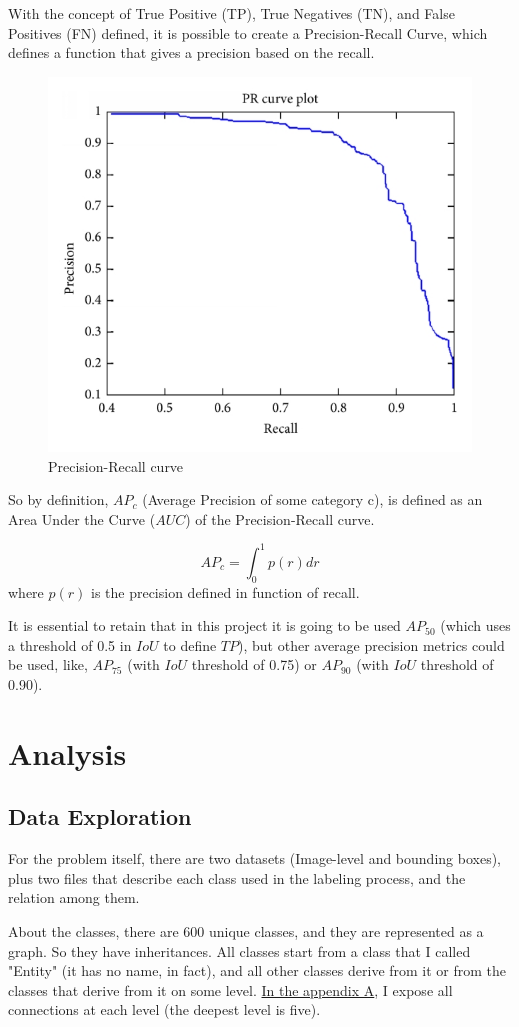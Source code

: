 \documentclass[11pt, a4paper, twocolumn]{article}
\begin{document}
With the concept of True Positive (TP), True Negatives (TN), and False Positives (FN) defined, it is possible to create a Precision-Recall Curve, which defines a function that gives a precision based on the recall.

\begin{figure}[!ht]
	
	\centering
	\includegraphics[width=.3\textwidth]{precision-recall.png}
	\caption{\scriptsize Precision-Recall curve \cite{medium:1}}
	
\end{figure}

So by definition, $AP_c$ (Average Precision of some category c), is defined as an Area Under the Curve ($AUC$) of the Precision-Recall curve.

{\centering
	\begin{equation*}
	AP_c = \int_{0}^{1} p(r) dr
	\end{equation*}
	where $p(r)$ is the precision defined in function of recall.}

It is essential to retain that in this project it is going to be used $AP_{50}$ (which uses a threshold of 0.5 in $IoU$ to define $TP$), but other average precision metrics could be used, like, $AP_{75}$ (with $IoU$ threshold of 0.75) or $AP_{90}$ (with $IoU$ threshold of 0.90).

\section{Analysis}

\subsection{Data Exploration}

For the problem itself, there are two datasets (Image-level and bounding boxes), plus two files that describe each class used in the labeling process, and the relation among them.

About the classes, there are 600 unique classes, and they are represented as a graph. So they have inheritances. All classes start from a class that I called "Entity" (it has no name, in fact), and all other classes derive from it or from the classes that derive from it on some level. \hyperref[sec:appendix-a]{In the appendix A}, I expose all connections at each level (the deepest level is five).
\end{document}
